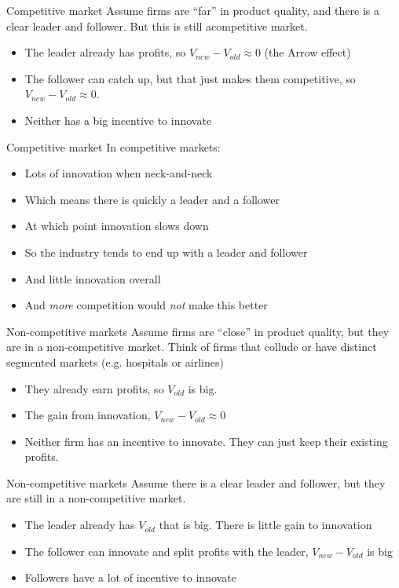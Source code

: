 \begin{frame}{Competitive market}
Assume firms are ``far'' in product quality, and there is a clear leader and follower. But this is still acompetitive market. 
\begin{itemize}
	\item The leader already has profits, so $V_{new} - V_{old} \approx 0$ (the Arrow effect)
	\item The follower can catch up, but that just makes them competitive, so $V_{new} - V_{old} \approx 0$. 
	\item Neither has a big incentive to innovate
\end{itemize}
\end{frame}

\begin{frame}{Competitive market}
In competitive markets:
\begin{itemize}
	\item Lots of innovation when neck-and-neck
	\item Which means there is quickly a leader and a follower
	\item At which point innovation slows down
	\item So the industry tends to end up with a leader and follower
	\item And little innovation overall
	\item And \textit{more} competition would \textit{not} make this better
\end{itemize}
\end{frame}

\begin{frame}{Non-competitive markets}
Assume firms are ``close'' in product quality, but they are in a non-competitive market. Think of firms that collude or have distinct segmented markets (e.g. hospitals or airlines)
\begin{itemize}
	\item They already earn profits, so $V_{old}$ is big. 
	\item The gain from innovation, $V_{new} - V_{old} \approx 0$
	\item Neither firm has an incentive to innovate. They can just keep their existing profits.
\end{itemize}
\end{frame}

\begin{frame}{Non-competitive markets}
Assume there is a clear leader and follower, but they are still in a non-competitive market.
\begin{itemize}
	\item The leader already has $V_{old}$ that is big. There is little gain to innovation
	\item The follower can innovate and split profits with the leader, $V_{new} - V_{old}$ is big
	\item Followers have a lot of incentive to innovate
\end{itemize}
\end{frame}

